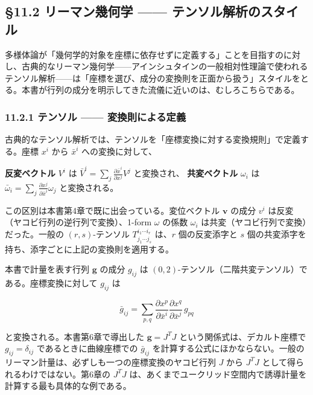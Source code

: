 \documentclass[a4paper,12pt,openany]{book}
\begin{document}
\hypertarget{ux30eaux30fcux30deux30f3ux5e7eux4f55ux5b66-ux30c6ux30f3ux30bdux30ebux89e3ux6790ux306eux30b9ux30bfux30a4ux30eb}{%
\subsection{§11.2 リーマン幾何学 ——
テンソル解析のスタイル}\label{ux30eaux30fcux30deux30f3ux5e7eux4f55ux5b66-ux30c6ux30f3ux30bdux30ebux89e3ux6790ux306eux30b9ux30bfux30a4ux30eb}}

多様体論が「幾何学的対象を座標に依存せずに定義する」ことを目指すのに対し、古典的なリーマン幾何学——アインシュタインの一般相対性理論で使われるテンソル解析——は「座標を選び、成分の変換則を正面から扱う」スタイルをとる。本書が行列の成分を明示してきた流儀に近いのは、むしろこちらである。

\hypertarget{ux30c6ux30f3ux30bdux30eb-ux5909ux63dbux5247ux306bux3088ux308bux5b9aux7fa9}{%
\subsubsection{11.2.1 テンソル ——
変換則による定義}\label{ux30c6ux30f3ux30bdux30eb-ux5909ux63dbux5247ux306bux3088ux308bux5b9aux7fa9}}

古典的なテンソル解析では、テンソルを「座標変換に対する変換規則」で定義する。座標
\(x^i\) から \(\bar{x}^i\) への変換に対して、

\textbf{反変ベクトル} \(V^i\) は
\(\bar{V}^i = \sum_j \frac{\partial \bar{x}^i}{\partial x^j} V^j\)
と変換され、 \textbf{共変ベクトル} \(\omega_i\) は
\(\bar{\omega}_i = \sum_j \frac{\partial x^j}{\partial \bar{x}^i} \omega_j\)
と変換される。

この区別は本書第4章で既に出会っている。変位ベクトル \(\mathbf{v}\)
の成分 \(v^i\) は反変（ヤコビ行列の逆行列で変換）、1-form \(\omega\)
の係数 \(\omega_i\) は共変（ヤコビ行列で変換）だった。一般の
\((r,s)\)-テンソル \(T^{i_1\cdots i_r}_{j_1\cdots j_s}\) は、\(r\)
個の反変添字と \(s\)
個の共変添字を持ち、添字ごとに上記の変換則を適用する。

本書で計量を表す行列 \(\mathbf{g}\) の成分 \(g_{ij}\) は
\((0,2)\)-テンソル（二階共変テンソル）である。座標変換に対して
\(g_{ij}\) は

\[\bar{g}_{ij} = \sum_{p,q} \frac{\partial x^p}{\partial \bar{x}^i} \frac{\partial x^q}{\partial \bar{x}^j}\,g_{pq}\]

と変換される。本書第6章で導出した \(\mathbf{g} = J^T J\)
という関係式は、デカルト座標で \(g_{ij} = \delta_{ij}\)
であるときに曲線座標での \(\bar{g}_{ij}\)
を計算する公式にほかならない。一般のリーマン計量は、必ずしも一つの座標変換のヤコビ行列
\(J\) から \(J^T J\) として得られるわけではない。第6章の \(J^T J\)
は、あくまでユークリッド空間内で誘導計量を計算する最も具体的な例である。
\end{document}

